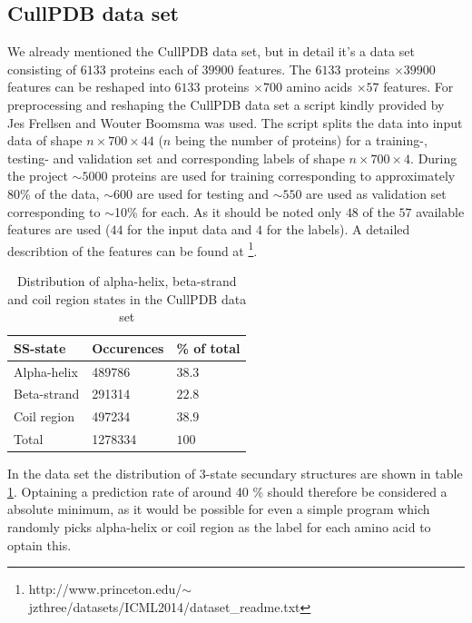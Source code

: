 \documentclass{article}
\begin{document}
\subsection{CullPDB data set}
We already mentioned the CullPDB data set, but in detail it's a data set consisting of $6133$ proteins each of $39900$ features. The $6133$ proteins $\times39900$ features can be reshaped into $6133$ proteins $\times700$ amino acids $\times57$ features. For preprocessing and reshaping the CullPDB data set a script kindly provided by Jes Frellsen and Wouter Boomsma was used. The script splits the data into input data of shape $n\times700\times44$ ($n$ being the number of proteins) for a training-, testing- and validation set and corresponding labels of shape $n\times700\times4$. During the project $\sim5000$ proteins are used for training corresponding to approximately 80\% of the data, $\sim600$ are used for testing and $\sim550$ are used as validation set corresponding to $\sim$10\% for each. As it should be noted only $48$ of the $57$ available features are used ($44$ for the input data and $4$ for the labels). A detailed describtion of the features can be found at \footnote{http://www.princeton.edu/$\sim$jzthree/datasets/ICML2014/dataset\_readme.txt}. 

\begin{table}[t]
  \label{table:distribution}
  \centering
  \begin{tabular}{lll}
    \toprule
    SS-state     & Occurences     & \% of total \\
    \midrule
    Alpha-helix & 489786 & $38.3$     \\
    Beta-strand & 291314 & $22.8$     \\
    Coil region & 497234 & $38.9$     \\
    \bottomrule
    Total 		& 1278334 & $100$ \\
  \end{tabular}
  \caption{Distribution of alpha-helix, beta-strand and coil region states in the CullPDB data set}
\end{table}

In the data set the distribution of 3-state secundary structures are shown in table \ref{table:distribution}. Optaining a prediction rate of around 40 \% should therefore be considered a absolute minimum, as it would be possible for even a simple program which randomly picks alpha-helix or coil region as the label for each amino acid to optain this.   
\end{document}
